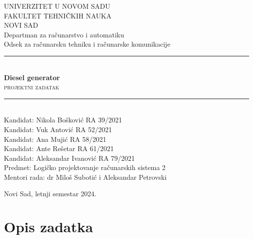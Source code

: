 \documentclass[a4paper, 11pt, titlepage]{article}
\title{\reporttitle}
\date{\today}
\def\departman{Departman za računarstvo i automatiku}
\def\odsek{Odsek za računarsku tehniku i računarske komunikacije}
\def\reporttitle{Diesel generator}
\def\institutionname{UNIVERZITET U NOVOM SADU}
\def\institutionnames{FAKULTET TEHNIČKIH NAUKA}
\def\cityname{NOVI SAD}
\def\authornameA{Kandidat: Nikola Bošković RA 39/2021}
\def\authornameB{Kandidat: Vuk Antović RA 52/2021}
\def\authornameC{Kandidat: Ana Mujić RA 58/2021}
\def\authornameD{Kandidat: Ante Rešetar RA 61/2021}
\def\authornameE{Kandidat: Aleksandar Ivanović RA 79/2021}
\def\predmet{Predmet: Logičko projektovanje računarskih sistema 2}
\def\mentor{Mentori rada: dr Miloš Subotić i Aleksandar Petrovski}
\def\reportsubtitleA{projektni zadatak}
\begin{document}
\begin{titlepage} 
\newcommand{\HRule}{\rule{\linewidth}{0.5mm}}

\center
\textsc{\Large \institutionname}\\[0.2cm]
\textsc{\Large \institutionnames}\\[0.2cm]
\textsc{\Large \cityname}\\[0.2cm]
\textmd{\Large \departman}\\[0.1cm] 
\textmd{\Large \odsek}\\[0.1cm] 


\HRule\\[0.8cm]

{\Huge\bfseries \reporttitle}\\[0.4cm]
\else
{\textsc{\huge \reportsubtitleA}}\\[0.4cm] 
\fi
\HRule\\[1.5cm]

\authornameA \\[0.5cm]
\authornameB \\[0.5cm]
\authornameC \\[0.5cm]
\authornameD \\[0.5cm]
\authornameE \\[0.5cm]


\predmet\\[0.5cm]
\mentor \\[0.5cm]

\vfill\vfill\vfill\vfill\vfill\vfill\vfill\vfill\vfill\vfill\vfill\vfill\vfill\vfill\vfill\vfill\vfill\vfill\vfill\vfill\vfill

{\large Novi Sad, letnji semestar 2024.}

 
\end{titlepage}
{\hypersetup{linkcolor=black} 
\thispagestyle{empty}
\newpage
\thispagestyle{empty}
\tableofcontents
\newpage

}

\newpage
\section{Opis zadatka}
\end{document}
